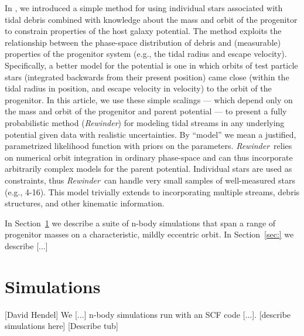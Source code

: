 \documentclass[letterpaper,12pt,preprint]{aastex}
\newcommand{\rewinder}{\emph{Rewinder}}
\begin{document}
In \citet{apw13}, we introduced a simple method for using individual stars associated with tidal debris combined with knowledge about the mass and orbit of the progenitor to constrain properties of the host galaxy potential. The method exploits the relationship between the phase-space distribution of debris and (measurable) properties of the progenitor system (e.g., the tidal radius and escape velocity).  Specifically, a better model for the potential is one in which orbits of test particle stars (integrated backwards from their present position) came close (within the tidal radius in position, and escape velocity in velocity) to the orbit of the progenitor. In this article, we use these simple scalings --- which depend only on the mass and orbit of the progenitor and parent potential --- to present a fully probabilistic method (\rewinder) for modeling tidal streams in any underlying potential given data with realistic uncertainties. By ``model'' we mean a justified, parametrized likelihood function with priors on the parameters. \rewinder\, relies on numerical orbit integration in ordinary phase-space and can thus incorporate arbitrarily complex models for the parent potential. Individual stars are used as constraints, thus \rewinder\, can handle very small samples of well-measured stars (e.g., 4-16). This model trivially extends to incorporating multiple streams, debris structures, and other kinematic information. 

In Section~\ref{sec:sims} we describe a suite of n-body simulations that span a range of progenitor masses on a characteristic, mildly eccentric orbit. In Section~\ref{sec:} we describe [...]

\section{Simulations}\label{sec:sims}
[David Hendel]
We [...] n-body simulations run with an SCF code [...]. [describe simulations here] [Describe tub]
\end{document}
